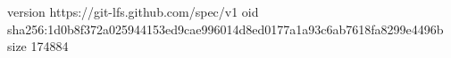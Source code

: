 version https://git-lfs.github.com/spec/v1
oid sha256:1d0b8f372a025944153ed9cae996014d8ed0177a1a93c6ab7618fa8299e4496b
size 174884

